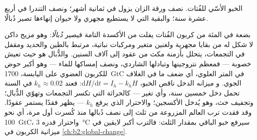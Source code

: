 \begin{omfigure}

{\small الخبو الأسّي للفُتات. نصف ورقة الزان يزول
في ثمانية أشهر؛ ونصف  التندرا في أربع عشرة سنة؛ والبقية
التي لا يستطيع مجهري ولا حيوان إنهاءها تصير دُبالًا.}
\end{omfigure}

\begin{proposition}\label{prop:b2:living-soil:humus}
بضعة في المئة من كربون الفُتات يفلت من الأكسدة التامة
فيصير \emph{دُبالًا}: وهو مزيج داكن لا شكل له من بقايا
مجهرية ولغنين متغير ومركبات نباتية، مرتبط بالطين
والحديد ومقفل في التجمعات، يتحلل بأزمنة مكث من
عقود إلى آلاف السنين. والدُّبال هو حيث تعيش خصوبة 
--- فمعظم نتروجينها وتبادلها الشاردي، ونصف إمساكها للماء ---
وهو أكبر حوض للكربون العضوي على اليابسة،
\qty{1700}{GtC} في المتر العلوي، أي ضعف ما في الغلاف الجوي. و
ميزانه الدخل ناقص الخبو، $\mathrm{d}H/\mathrm{d}t = I_h - k_hH$:
فعند $k_h \approx 0.02$ في السنة تحمل  دخل خمسين سنة،
وأي تغير --- كالحراثة التي تكسر التجمعات
وتهوّي الدُّبال؛ وتجفيف خث، وهو يُدخل الأكسجين؛
والاحترار الذي يرفع $k_h$ --- يظهر فقدًا يستمر
عقودًا. وقد فقدت ترب العالم المزروعة من ثلث إلى
نصف دُبالها منذ كُسرت أول مرة، أي نحو
\qty{100}{GtC}، واحترار قدره \qty{3}{\celsius} سيرفع
خبو الباقي بمقدار الثلث: فالترب أكبر لايقين في
ميزانية الكربون في \cref{ch:b2:global-change}.
\end{proposition}

